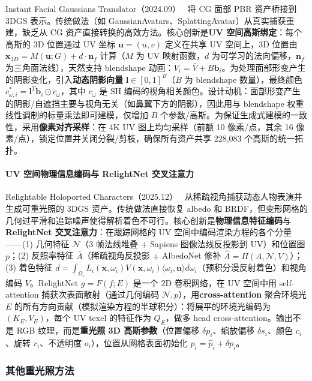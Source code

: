 Instant Facial Gaussians Translator（2024.09）~\cite{2409_07441} 将 CG 面部 PBR 资产桥接到 3DGS 表示。传统做法（如 GaussianAvatars、SplattingAvatar）从真实捕获重建，缺乏从 CG 资产直接转换的高效方法。核心创新是\textbf{UV 空间高斯绑定}：每个高斯的 3D 位置通过 UV 坐标 $\mathbf{u}=(u,v)$ 定义在共享 UV 空间上，3D 位置由 $\mathbf{x}_{3D} = M(\mathbf{u}; G) + d \cdot \mathbf{n}_f$ 计算（$M$ 为 UV 映射函数，$d$ 为可学习的法向偏移，$\mathbf{n}_f$ 为三角面法线），天然支持 blendshape 动画：$V_i = \bar{V} + B \mathbf{b}_i$。为处理面部形变产生的阴影变化，引入\textbf{动态阴影向量} $\mathbf{l} \in [0,1]^B$（$B$ 为 blendshape 数量），最终颜色 $c^*_{\omega,i} = \mathbf{l}^T \mathbf{b}_i \odot c_\omega$，其中 $c_\omega$ 是 SH 编码的视角相关颜色。设计动机：面部形变产生的阴影/自遮挡主要与视角无关（如鼻翼下方的阴影），因此用与 blendshape 权重线性调制的标量乘法即可建模，仅增加 $B$ 个参数/高斯。为保证生成式建模的一致性，采用\textbf{像素对齐采样}：在 4K UV 图上均匀采样（前额 10 像素/点，其余 16 像素/点），锁定位置并关闭分裂/剪枝，确保所有资产共享 228,083 个高斯的统一拓扑。

\paragraph{UV 空间物理信息编码与 RelightNet 交叉注意力}

Relightable Holoported Characters（2025.12）~\cite{2512_00255} 从稀疏视角捕获动态人物表演并生成可重光照的 3DGS 资产。传统做法直接恢复 albedo 和 BRDF，但变形网格的几何过平滑和追踪噪声使得解析着色不可行。核心创新是\textbf{物理信息特征编码}与\textbf{RelightNet 交叉注意力}：在跟踪网格的 UV 空间中编码渲染方程的各个分量——(1) 几何特征 $\mathcal{N}$（3 帧法线堆叠 $+$ Sapiens 图像法线反投影到 UV）和位置图 $p$；(2) 反照率特征 $\bar{A}$（稀疏视角反投影 $+$ AlbedoNet 修补 $\hat{A} = H(A, \mathcal{N}, V)$）；(3) 着色特征 $d = \int_{\Omega_i} L_i(\mathbf{x}, \omega_i) V(\mathbf{x}, \omega_i) \langle\omega_i, \mathbf{n}\rangle d\omega_i$（预积分漫反射着色）和视角编码 $V$。RelightNet $g = F(f; E)$ 是一个 2D 卷积网络，在 UV 空间中用 self-attention 捕获次表面散射（通过几何编码 $\mathcal{N}, p$），用\textbf{cross-attention} 聚合环境光 $E$ 的所有方向贡献（模拟渲染方程的半球积分）：将展平的环境光编码为 $(K_E, V_E)$，每个 UV texel 的特征作为 $Q_E$，做多 head cross-attention。输出不是 RGB 纹理，而是\textbf{重光照 3D 高斯参数}（位置偏移 $\delta p_i$、缩放偏移 $\delta s_i$、颜色 $c_i$、旋转 $r_i$、不透明度 $o_i$），位置从网格表面初始化 $p_i = \hat{p}_i + \delta p_i$。

\subsubsection{其他重光照方法}

